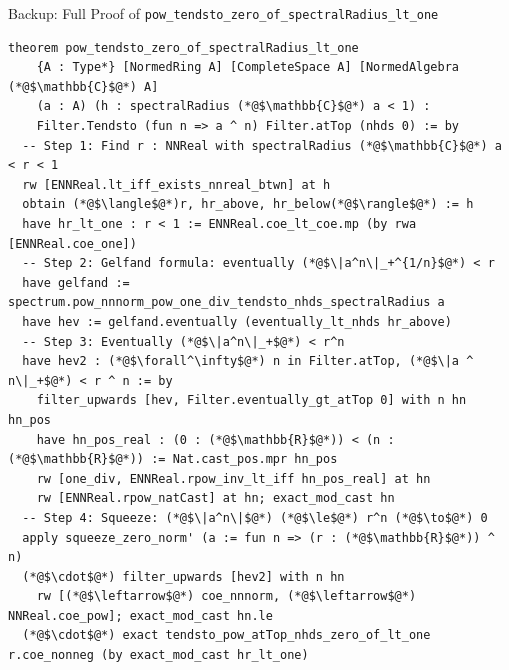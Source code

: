 \documentclass[aspectratio=169,10pt]{beamer}
\begin{document}
\begin{frame}[fragile]{Backup: Full Proof of \texttt{pow\_tendsto\_zero\_of\_spectralRadius\_lt\_one}}
\vspace{-0.7em}
\begin{lstlisting}[basicstyle=\ttfamily\fontsize{4.5}{5.5}\selectfont\color{white}]
theorem pow_tendsto_zero_of_spectralRadius_lt_one
    {A : Type*} [NormedRing A] [CompleteSpace A] [NormedAlgebra (*@$\mathbb{C}$@*) A]
    (a : A) (h : spectralRadius (*@$\mathbb{C}$@*) a < 1) :
    Filter.Tendsto (fun n => a ^ n) Filter.atTop (nhds 0) := by
  -- Step 1: Find r : NNReal with spectralRadius (*@$\mathbb{C}$@*) a < r < 1
  rw [ENNReal.lt_iff_exists_nnreal_btwn] at h
  obtain (*@$\langle$@*)r, hr_above, hr_below(*@$\rangle$@*) := h
  have hr_lt_one : r < 1 := ENNReal.coe_lt_coe.mp (by rwa [ENNReal.coe_one])
  -- Step 2: Gelfand formula: eventually (*@$\|a^n\|_+^{1/n}$@*) < r
  have gelfand := spectrum.pow_nnnorm_pow_one_div_tendsto_nhds_spectralRadius a
  have hev := gelfand.eventually (eventually_lt_nhds hr_above)
  -- Step 3: Eventually (*@$\|a^n\|_+$@*) < r^n
  have hev2 : (*@$\forall^\infty$@*) n in Filter.atTop, (*@$\|a ^ n\|_+$@*) < r ^ n := by
    filter_upwards [hev, Filter.eventually_gt_atTop 0] with n hn hn_pos
    have hn_pos_real : (0 : (*@$\mathbb{R}$@*)) < (n : (*@$\mathbb{R}$@*)) := Nat.cast_pos.mpr hn_pos
    rw [one_div, ENNReal.rpow_inv_lt_iff hn_pos_real] at hn
    rw [ENNReal.rpow_natCast] at hn; exact_mod_cast hn
  -- Step 4: Squeeze: (*@$\|a^n\|$@*) (*@$\le$@*) r^n (*@$\to$@*) 0
  apply squeeze_zero_norm' (a := fun n => (r : (*@$\mathbb{R}$@*)) ^ n)
  (*@$\cdot$@*) filter_upwards [hev2] with n hn
    rw [(*@$\leftarrow$@*) coe_nnnorm, (*@$\leftarrow$@*) NNReal.coe_pow]; exact_mod_cast hn.le
  (*@$\cdot$@*) exact tendsto_pow_atTop_nhds_zero_of_lt_one r.coe_nonneg (by exact_mod_cast hr_lt_one)
\end{lstlisting}
\end{frame}
\end{document}
